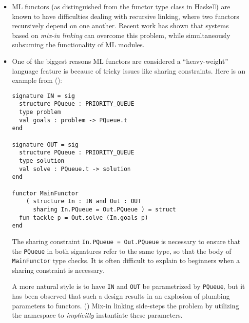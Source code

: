 \begin{itemize}
    \item ML functors (as distinguished from the functor type class
    in Haskell) are known to have difficulties dealing with
    recursive linking, where two functors recursively depend on
    one another.  Recent work has shown that systems based on
    \emph{mix-in linking} can overcome this problem, while simultaneously
    subsuming the functionality of ML modules.

    \item One of the biggest reasons ML functors are considered a
    ``heavy-weight'' language feature is because of tricky issues like
    sharing constraints.  Here is an example from ():  

\begin{verbatim}
signature IN = sig
  structure PQueue : PRIORITY_QUEUE
  type problem
  val goals : problem -> PQueue.t
end

signature OUT = sig
  structure PQueue : PRIORITY_QUEUE
  type solution
  val solve : PQueue.t -> solution
end

functor MainFunctor
    ( structure In : IN and Out : OUT
      sharing In.PQueue = Out.PQueue ) = struct
  fun tackle p = Out.solve (In.goals p)
end
\end{verbatim}

    The sharing constraint \verb|In.PQueue = Out.PQueue| is necessary to
    ensure that the \verb|PQueue| in both signatures refer to the same
    type, so that the body of \verb|MainFunctor| type checks.  It is
    often difficult to explain to beginners when a sharing constraint is
    necessary.

    A more natural style is to have \verb|IN| and \verb|OUT| be
    parametrized by \verb|PQueue|, but it has been observed that such a
    design results in an explosion of plumbing parameters to functors.
    () Mix-in linking
    side-steps the problem by utilizing the namespace to
    \emph{implicitly} instantiate these parameters.


\end{itemize}
